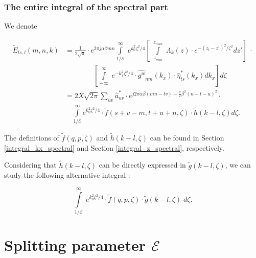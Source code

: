 \documentclass[preprint,12pt]{elsarticle}
\begin{document}
\subsubsection{The entire integral of the spectral part}
 We denote
 \begin{small}
 \begin{equation}
 \begin{split}
 \widetilde{E}_{ts,l}(m,n,k) 
 &= \frac{1}{2\sqrt{\pi}}\cdot e^{2\pi j \alpha \beta mn} 
\int \limits^{\infty}_{1/\mathcal{E}} \; e^{k_0^2 \zeta^2/4} \left[ \; \int \limits^{z_{max}}_{z_{min}}\; \Lambda_k(z) \cdot e^{-(z_l- z')^2/\zeta^2} dz'\right]\ \cdot  \\
 &\qquad  \qquad \left[ \int \limits^{\infty}_{-\infty} \; e^{-k^2_{x}\zeta^2/4} \cdot  {\widehat{g^w}_{nm}}(k_{x}) \cdot \widehat{\eta}^*_{ts}(k_{x})dk_{x} \right] d\zeta \\
 &= 2X\sqrt{2\pi}\sum_{uv}\widehat{a}^*_{uv}\cdot e^{j2\pi\alpha\beta(mn - tv) -\frac{\pi}{2}\beta^2(n-t-u)^2}\cdot \\
 &\quad \int \limits^{\infty}_{1/\mathcal{E}} e^{k_0^2\zeta^2/4} \cdot \widetilde{f}(s+v-m,t+u+n,\zeta) \cdot \widetilde{h}(k-l,\zeta) d\zeta .
 \end{split}
 \label{E_spectral_nml_stk}
 \end{equation}
 \end{small}
 The definitions of $\widetilde{f}(q,p,\zeta)$ and $\widetilde{h}(k-l, \zeta)$ can be found in Section \ref{integral_kx_spectral} and Section \ref{integral_z_spectral}, respectively.

 Considering that $\widetilde{h}(k-l,\zeta)$ can be directly expressed in $\widetilde{g}(k-l,\zeta)$, we can study the following alternative integral :
 \begin{small}
 \begin{equation}
\int \limits^{\infty}_{1/\mathcal{E}} \; e^{k_0^2\zeta^2/4} \cdot \widetilde{f}(q,p,\zeta) \cdot \widetilde{g}(k-l,\zeta) \; d\zeta.
 \label{integral_spectral}
 \end{equation}
 \end{small}
\section{Splitting parameter $\mathcal{E}$}
\label{optimum_splitting_parameter}
\end{document}
